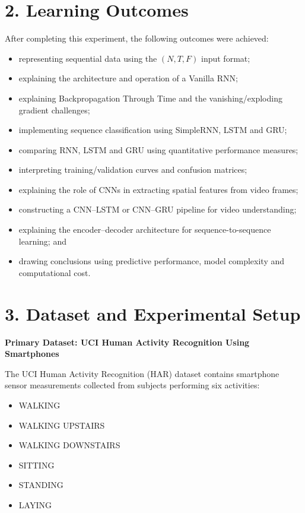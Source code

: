 \documentclass[10pt]{article}
\begin{document}
\section*{2. Learning Outcomes}

After completing this experiment, the following outcomes were achieved:

\begin{itemize}
\item representing sequential data using the $(N,T,F)$ input format;
\item explaining the architecture and operation of a Vanilla RNN;
\item explaining Backpropagation Through Time and the vanishing/exploding gradient challenges;
\item implementing sequence classification using SimpleRNN, LSTM and GRU;
\item comparing RNN, LSTM and GRU using quantitative performance measures;
\item interpreting training/validation curves and confusion matrices;
\item explaining the role of CNNs in extracting spatial features from video frames;
\item constructing a CNN--LSTM or CNN--GRU pipeline for video understanding;
\item explaining the encoder--decoder architecture for sequence-to-sequence learning; and
\item drawing conclusions using predictive performance, model complexity and computational cost.
\end{itemize}

\section*{3. Dataset and Experimental Setup}

\textbf{Primary Dataset: UCI Human Activity Recognition Using Smartphones}

The UCI Human Activity Recognition (HAR) dataset contains smartphone sensor
measurements collected from subjects performing six activities:

\begin{itemize}
\item WALKING
\item WALKING UPSTAIRS
\item WALKING DOWNSTAIRS
\item SITTING
\item STANDING
\item LAYING
\end{itemize}
\end{document}
